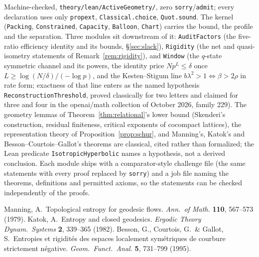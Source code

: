 Machine-checked, \texttt{theory/lean/ActiveGeometry/}, zero \texttt{sorry}/\texttt{admit}; every declaration uses
only \texttt{propext}, \texttt{Classical.choice}, \texttt{Quot.sound}. The kernel (\texttt{Packing},
\texttt{Constrained}, \texttt{Capacity}, \texttt{Balloon}, \texttt{Chart}) carries the bound, the profile and the
separation. Three modules sit downstream of it: \texttt{AuditFactors} (the five-ratio efficiency identity and its
bounds, \S\ref{sec:slack}), \texttt{Rigidity} (the net and quasi-isometry statements of Remark~\ref{rem:rigidity}),
and \texttt{Window} (the $q$-state symmetric channel and its powers, the identity price $N p^L\le\delta$ once
$L\ge\log(N/\delta)/(-\log p)$, and the Kesten--Stigum line $b\lambda^2>1\iff\beta>2\rho$ in rate form; exactness of
that line enters as the named hypothesis \texttt{ReconstructionThreshold}, proved classically for two letters and
claimed for three and four in the openai/math collection of October 2026, family 229). The geometry lemmas of
Theorem~\ref{thm:relational}'s lower bound (Skenderi's construction, residual finiteness, critical exponents of
cocompact lattices), the representation theory of Proposition~\ref{prop:schur}, and Manning's, Katok's and
Besson--Courtois--Gallot's theorems are classical, cited rather than formalized; the Lean predicate
\texttt{IsotropicHyperbolic} names a hypothesis, not a derived conclusion. Each module ships with a comparator-style
challenge file (the same statements with every proof replaced by \texttt{sorry}) and a job file naming the theorems,
definitions and permitted axioms, so the statements can be checked independently of the proofs.

 Manning, A.\ Topological entropy for geodesic flows. \emph{Ann.\ of Math.} \textbf{110}, 567--573 (1979).
 Katok, A.\ Entropy and closed geodesics. \emph{Ergodic Theory Dynam.\ Systems} \textbf{2}, 339--365 (1982).
 Besson, G., Courtois, G.\ \& Gallot, S.\ Entropies et rigidit\'es des espaces localement sym\'etriques de courbure strictement n\'egative. \emph{Geom.\ Funct.\ Anal.} \textbf{5}, 731--799 (1995).
